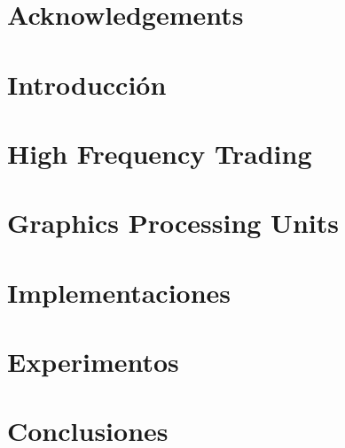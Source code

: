 \documentclass[spanish,12pt,letterpaper,oneside]{book}
\begin{document}
    

    \begin{spacing}{.97}
        \newpage
        

        \newpage
        \chapter*{Acknowledgements}
        \label{ch:acknowledgements}
        

        \newpage
        
        

        \chapter{Introducción}
        \label{ch:introduction}
        

        \chapter{High Frequency Trading}
        \label{ch:hft}
        

        \chapter{Graphics Processing Units}
        \label{ch:gpu}
        
       
        \chapter{Implementaciones}
        \label{ch:implementacion}
        

        \chapter{Experimentos}
        \label{ch:experimentos}
        

        \chapter{Conclusiones}
        \label{ch:conclusiones}
        

        
        
        \nocite{*}
    \end{spacing}
\end{document}
